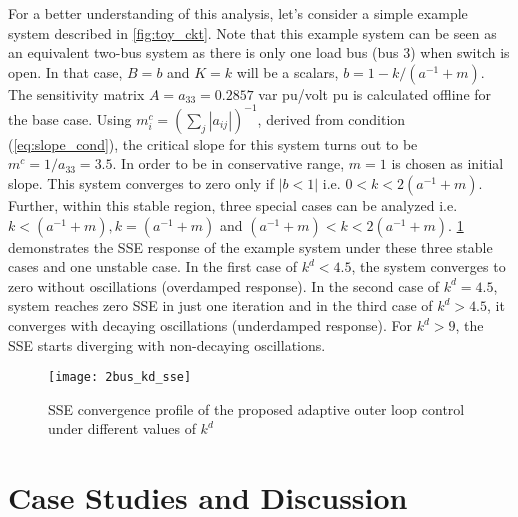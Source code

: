 \documentclass[journal]{IEEEtran}
\begin{document}
For a better understanding of this analysis, let's consider a simple example system described in \figurename \ref{fig:toy_ckt}. Note that this example system can be seen as an equivalent two-bus system as there is only one load bus (bus 3) when switch is open. In that case, $B=b$ and $K=k$ will be a scalars, $b=1-k/(a^{-1}+m)$. The sensitivity matrix $A=a_{33}=0.2857$ var pu/volt pu is calculated offline for the base case. Using %
$m_i^c=(\sum_j{|a_{ij}|})^{-1}$, derived from condition (\ref{eq:slope_cond}), the critical slope for this system turns out to be $m^c=1/a_{33}=3.5$. In order to be in conservative range, $m=1$ is chosen as initial slope. This system converges to zero only if $|b<1|$ i.e. $0<k<2(a^{-1}+m)$. Further, within this stable region, three special cases can be analyzed i.e. $k<(a^{-1}+m), k=(a^{-1}+m)$ and $(a^{-1}+m)<k<2(a^{-1}+m)$. \figurename \ref{fig:2bus_kd_sse} demonstrates the SSE response of the example system under these three stable cases and one unstable case. In the first case of $k^d<4.5$, the system converges to zero without oscillations (overdamped response). In the second case of $k^d=4.5$, system reaches zero SSE in just one iteration and in the third case of $k^d>4.5$, it converges with decaying oscillations (underdamped response). For $k^d>9$, the SSE starts diverging with non-decaying oscillations.
\begin{figure}[h]
\vspace{-0.5em}
	\centering
	\texttt{[image: 2bus\_kd\_sse]}
    \caption {SSE convergence profile of the proposed adaptive outer loop control under different values of $k^d$}
    \label{fig:2bus_kd_sse}   
\end{figure}

\vspace{-0.5em}
 \section{Case Studies and Discussion}
\end{document}
